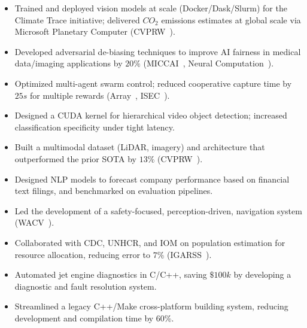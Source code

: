 \documentclass[11pt,a4paper,sans]{moderncv} %
\begin{document}
{
\begin{itemize} 
	\item Trained and deployed vision models at scale (Docker/Dask/Slurm) for the Climate Trace initiative; delivered $CO_2$ emissions estimates at global scale via Microsoft Planetary Computer (CVPRW~\cite{mukherjee2021towards}).
	\item Developed adversarial de-biasing techniques to improve AI fairness in medical data/imaging applications by $20\%$ (MICCAI~\cite{yuan2023edgemixup}, Neural Computation~\cite{paul2022tara}).
	\item Optimized multi-agent swarm control; reduced cooperative capture time by $25s$ for multiple rewards (Array~\cite{hadzic2022100218}, ISEC~\cite{buckley2021interdisciplinary}).
	\item Designed a CUDA kernel for hierarchical video object detection; increased classification specificity under tight latency.
\end{itemize}
}


{
\begin{itemize}
	\item Built a multimodal dataset (LiDAR, imagery) and architecture that outperformed the prior SOTA by $13\%$ (CVPRW~\cite{RasterNetpaper}).
	\item Designed NLP models to forecast company performance based on financial text filings, and benchmarked on evaluation pipelines.
	\item Led the development of a safety-focused, perception-driven, navigation system (WACV~\cite{WACVpaper}).
	\item Collaborated with CDC, UNHCR, and IOM on population estimation for resource allocation, reducing error to $7\%$ (IGARSS~\cite{DCApaper}).
\end{itemize}
}


{
\begin{itemize}
	\item Automated jet engine diagnostics in C/C++, saving $\$100k$ by developing a diagnostic and fault resolution system.
	\item Streamlined a legacy C++/Make cross-platform building system, reducing development and compilation time by $60\%$.
\end{itemize}
}
\end{document}
